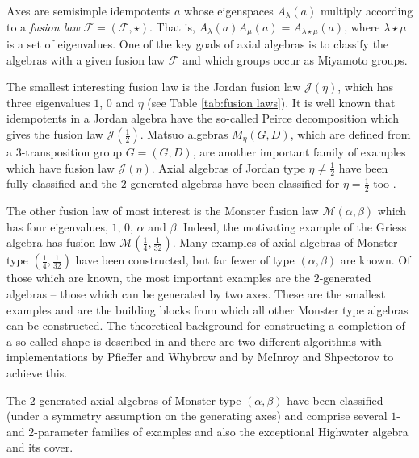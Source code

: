 \documentclass[11pt, a4paper]{article}
\theoremstyle{plain}
\theoremstyle{definition}
\newcommand\al{\alpha}
\newcommand\bt{\beta}
\newcommand\lm{\lambda}
\newcommand\cF{\mathcal{F}}
\newcommand\cJ{\mathcal{J}}
\newcommand\cM{\mathcal{M}}
\newcommand{\0}{\overline{0}}
\newcommand{\2}{\overline{2}}
\newcommand{\1}{\mathbbm{1}}
\begin{document}
Axes are semisimple idempotents $a$ whose eigenspaces $A_\lm(a)$ multiply according to a \emph{fusion law} $\cF = (\cF, \star)$.  That is, $A_\lm(a) A_\mu(a) = A_{\lm \star \mu}(a)$, where $\lm \star \mu$ is a set of eigenvalues.  One of the key goals of axial algebras is to classify the algebras with a given fusion law $\cF$ and which groups occur as Miyamoto groups.

The smallest interesting fusion law is the Jordan fusion law $\cJ(\eta)$, which has three eigenvalues $1$, $0$ and $\eta$ (see Table \ref{tab:fusion laws}).  It is well known that idempotents in a Jordan algebra have the so-called Peirce decomposition which gives the fusion law $\cJ(\frac{1}{2})$.  Matsuo algebras $M_\eta(G,D)$, which are defined from a $3$-transposition group $G = (G, D)$, are another important family of examples which have fusion law $\cJ(\eta)$.  Axial algebras of Jordan type $\eta \neq \frac{1}{2}$ have been fully classified and the $2$-generated algebras have been classified for $\eta = \frac{1}{2}$ too \cite{Axial2}.

The other fusion law of most interest is the Monster fusion law $\cM(\al,\bt)$ which has four eigenvalues, $1$, $0$, $\al$ and $\bt$.  Indeed, the motivating example of the Griess algebra has fusion law $\cM(\frac{1}{4}, \frac{1}{32})$.  Many examples of axial algebras of Monster type $(\frac{1}{4}, \frac{1}{32})$ have been constructed, but far fewer of type $(\al, \bt)$ are known.  Of those which are known, the most important examples are the $2$-generated algebras -- those which can be generated by two axes.  These are the smallest examples and are the building blocks from which all other Monster type algebras can be constructed.  The theoretical background for constructing a completion of a so-called shape is described in \cite{forbidden} and there are two different algorithms with implementations by Pfieffer and Whybrow \cite{Maddycode} and by McInroy and Shpectorov \cite{axialconstruction} to achieve this.


The $2$-generated axial algebras of Monster type $(\al,\bt)$ have been classified (under a symmetry assumption on the generating axes) and comprise several $1$- and $2$-parameter families of examples and also the exceptional Highwater algebra and its cover.
\end{document}
